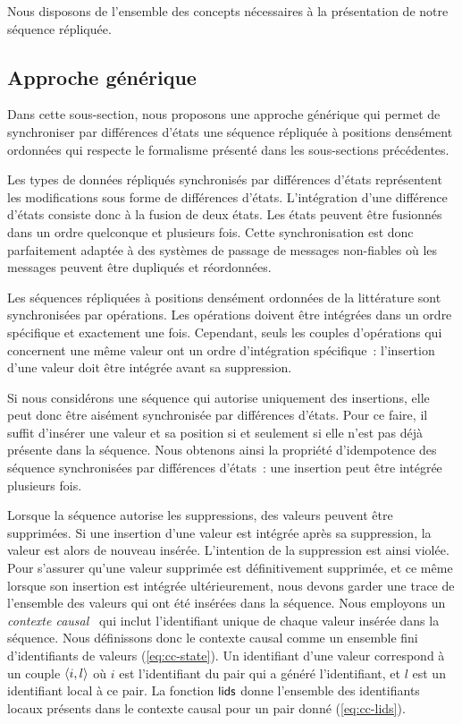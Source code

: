 Nous disposons de l'ensemble des concepts nécessaires à la présentation de notre séquence répliquée.


\subsection{Approche générique}

Dans cette sous-section, nous proposons une approche générique qui permet de synchroniser par différences d'états une séquence répliquée à positions densément ordonnées qui respecte le formalisme présenté dans les sous-sections précédentes.

Les types de données répliqués synchronisés par différences d'états représentent les modifications sous forme de différences d'états.
L'intégration d'une différence d'états consiste donc à la fusion de deux états.
Les états peuvent être fusionnés dans un ordre quelconque et plusieurs fois.
Cette synchronisation est donc parfaitement adaptée à des systèmes de passage de messages non-fiables où les messages peuvent être dupliqués et réordonnées.

Les séquences répliquées à positions densément ordonnées de la littérature sont synchronisées par opérations.
Les opérations doivent être intégrées dans un ordre spécifique et exactement une fois.
Cependant, seuls les couples d'opérations qui concernent une même valeur ont un ordre d'intégration spécifique~: l'insertion d'une valeur doit être intégrée avant sa suppression.

Si nous considérons une séquence qui autorise uniquement des insertions, elle peut donc être aisément synchronisée par différences d'états.
Pour ce faire, il suffit d'insérer une valeur et sa position si et seulement si elle n'est pas déjà présente dans la séquence.
Nous obtenons ainsi la propriété d'idempotence des séquence synchronisées par différences d'états~: une insertion peut être intégrée plusieurs fois.

Lorsque la séquence autorise les suppressions, des valeurs peuvent être supprimées.
Si une insertion d'une valeur est intégrée après sa suppression, la valeur est alors de nouveau insérée.
L'intention de la suppression est ainsi violée.
Pour s'assurer qu'une valeur supprimée est définitivement supprimée, et ce même lorsque son insertion est intégrée ultérieurement, nous devons garder une trace de l'ensemble des valeurs qui ont été insérées dans la séquence.
Nous employons un \emph{contexte causal}~\autocite{almeida_2018_delta-crdt-revisited} qui inclut l'identifiant unique de chaque valeur insérée dans la séquence.
Nous définissons donc le contexte causal comme un ensemble fini d'identifiants de valeurs (\autoref{eq:cc-state}).
Un identifiant d'une valeur correspond à un couple $\tuple*{i, l}$ où $i$ est l'identifiant du pair qui a généré l'identifiant, et $l$ est un identifiant local à ce pair.
La fonction $\trm{lids}$ donne l'ensemble des identifiants locaux présents dans le contexte causal pour un pair donné (\autoref{eq:cc-lids}).

